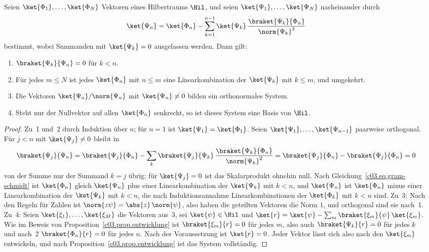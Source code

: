 \begin{proposition}\label{c03.prop.gram-schmidt}
  Seien $\ket{\Phi_1}, \dots, \ket{\Phi_N}$ Vektoren eines Hilbertraums $\Hil$, und seien
  $\ket{\Psi_1}, \dots, \ket{\Psi_N}$ nacheinander durch
  \begin{equation}\label{c03.eq.gram-schmidt}
    \ket{\Psi_n} = \ket{\Phi_n} - \sum_{k=1}^{n-1} \ket{\Psi_k}\, \frac{\braket{\Psi_k}{\Phi_n}}{\norm{\Psi_k}^2}
  \end{equation}
  bestimmt, wobei Summanden mit $\ket{\Psi_k} = 0$ ausgelassen werden. Dann gilt:
  \begin{enumerate}
    \item $\braket{\Psi_k}{\Psi_n} = 0$ für $k < n$.
    \item Für jedes $m \leq N$ ist jedes $\ket{\Phi_n}$ mit $n \leq m$ eine Linearkombination
      der $\ket{\Psi_k}$ mit $k \leq m$, und umgekehrt.
    \item Die Vektoren $\ket{\Psi_n} / \norm{\Psi_n}$ mit $\ket{\Psi_n} \neq 0$ bilden ein
      orthonormales System.
    \item Steht nur der Nullvektor auf allen $\ket{\Phi_n}$ senkrecht, so ist dieses System
      eine Basis von $\Hil$.
  \end{enumerate}
\end{proposition}
\begin{proof}
  Zu~1 und~2 durch Induktion über $n$; für $n = 1$ ist $\ket{\Psi_1} = \ket{\Phi_1}$. Seien
  $\ket{\Psi_1}, \dots, \ket{\Psi_{n-1}}$ paarweise orthogonal. Für $j < n$ mit
  $\ket{\Psi_j} \neq 0$ bleibt in
  \begin{equation}\label{c03.eq.gs-beweis}
    \braket{\Psi_j}{\Psi_n}
    = \braket{\Psi_j}{\Phi_n} - \sum_{k} \braket{\Psi_j}{\Psi_k}\, \frac{\braket{\Psi_k}{\Phi_n}}{\norm{\Psi_k}^2}
    = \braket{\Psi_j}{\Phi_n} - \braket{\Psi_j}{\Phi_n} = 0
  \end{equation}
  von der Summe nur der Summand $k = j$ übrig; für $\ket{\Psi_j} = 0$ ist das Skalarprodukt
  ohnehin null. Nach Gleichung~\eqref{c03.eq.gram-schmidt} ist $\ket{\Phi_n}$ gleich
  $\ket{\Psi_n}$ plus einer Linearkombination der $\ket{\Psi_k}$ mit $k < n$, und
  $\ket{\Psi_n}$ ist $\ket{\Phi_n}$ minus einer Linearkombination der $\ket{\Psi_k}$ mit
  $k < n$, die nach Induktionsannahme Linearkombinationen der $\ket{\Phi_k}$ mit $k < n$ sind.
  Zu~3: Nach den Regeln für Zahlen ist $\norm{z\psi} = \abs{z}\, \norm{\psi}$, also haben die
  geteilten Vektoren die Norm $1$, und orthogonal sind sie nach~1. Zu~4: Seien
  $\ket{\xi_1}, \dots, \ket{\xi_M}$ die Vektoren aus~3, sei $\ket{\psi} \in \Hil$ und
  $\ket{r} = \ket{\psi} - \sum_m \braket{\xi_m}{\psi}\, \ket{\xi_m}$. Wie im Beweis von
  Proposition~\ref{c03.prop.entwicklung} ist $\braket{\xi_m}{r} = 0$ für jedes $m$, also
  auch $\braket{\Psi_k}{r} = 0$ für jedes $k$ und nach~2 $\braket{\Phi_n}{r} = 0$ für jedes
  $n$. Nach der Voraussetzung ist $\ket{r} = 0$. Jeder Vektor lässt sich also nach den
  $\ket{\xi_m}$ entwickeln, und nach Proposition~\ref{c03.prop.entwicklung} ist das System
  vollständig.
\end{proof}

